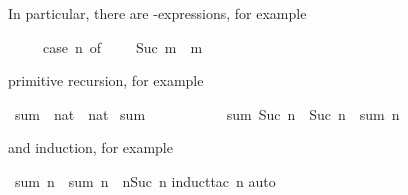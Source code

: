 %
\begin{isabellebody}%
\def\isabellecontext{natsum}%
%
\begin{isamarkuptext}%
\noindent
In particular, there are -expressions, for example
\begin{isabelle}%
\ \ \ \ \ case\ n\ of\ \ {\isasymRightarrow}\ \ {\isacharbar}\ Suc\ m\ {\isasymRightarrow}\ m%
\end{isabelle}
primitive recursion, for example%
\end{isamarkuptext}%
\ sum\ {\isacharcolon}{\isacharcolon}\ {\isachardoublequote}nat\ {\isasymRightarrow}\ nat{\isachardoublequote}\isanewline
{}\ {\isachardoublequote}sum\ \ {\isacharequal}\ \isanewline
\ \ \ \ \ \ \ \ {\isachardoublequote}sum\ {\isacharparenleft}Suc\ n{\isacharparenright}\ {\isacharequal}\ Suc\ n\ {\isacharplus}\ sum\ n{\isachardoublequote}%
\begin{isamarkuptext}%
\noindent
and induction, for example%
\end{isamarkuptext}%
\ {\isachardoublequote}sum\ n\ {\isacharplus}\ sum\ n\ {\isacharequal}\ n{\isacharasterisk}{\isacharparenleft}Suc\ n{\isacharparenright}{\isachardoublequote}\isanewline
{}induct{\isacharunderscore}tac\ n{\isacharparenright}\isanewline
{}auto{\isacharparenright}\isanewline
\end{isabellebody}%
